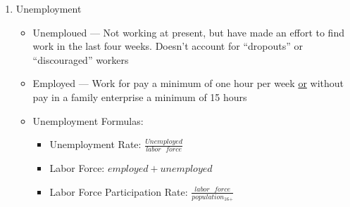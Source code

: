 \documentclass[12pt]{article}
\begin{document}
\begin{enumerate}
\begin{itemize}
    \end{itemize}

  \item Unemployment

    \begin{itemize}

      \item Unemploued — Not working at present, but have made an effort to find work in the last four weeks. Doesn't account for “dropouts” or “discouraged” workers

      \item Employed — Work for pay a minimum of one hour per week \underline{or} without pay in a family enterprise a minimum of 15 hours

      \item Unemployment Formulas:

        \begin{itemize}

          \item Unemployment Rate: $\frac{Unemployed}{labor\text{ }force}$

          \item Labor Force: $employed + unemployed$

          \item Labor Force Participation Rate: $\frac{labor\text{ }force}{population_{\text{16+}}}$

        \end{itemize}

    \end{itemize}

\end{enumerate}
\end{document}
